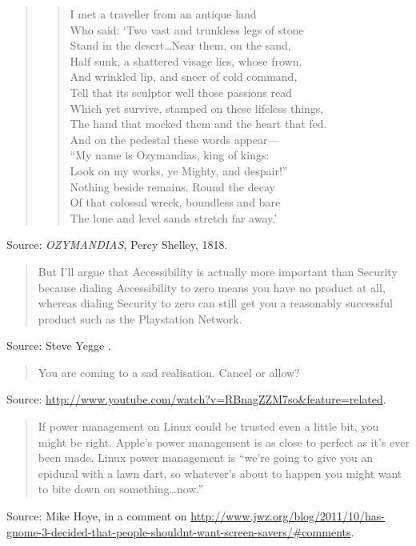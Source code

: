 \documentclass[a4paper]{article}
\begin{document}
\begin{quote}
\begin{verse}
I met a traveller from an antique land \\
Who said: `Two vast and trunkless legs of stone \\
Stand in the desert\ldots Near them, on the sand, \\
Half sunk, a shattered visage lies, whose frown, \\
And wrinkled lip, and sneer of cold command, \\
Tell that its sculptor well those passions read \\
Which yet survive, stamped on these lifeless things, \\
The hand that mocked them and the heart that fed. \\
And on the pedestal these words appear--- \\
``My name is Ozymandias, king of kings: \\
Look on my works, ye Mighty, and despair!'' \\
Nothing beside remains. Round the decay \\
Of that colossal wreck, boundless and bare \\
The lone and level sands stretch far away.' \\
\end{verse}
\end{quote}
Source: \emph{OZYMANDIAS}, Percy Shelley, 1818.
\medskip

\begin{quote}
	But I'll argue that Accessibility is actually more important than Security because dialing
Accessibility to zero means you have no product at all, whereas dialing Security to zero can still
get you a reasonably successful product such as the Playstation Network.
\end{quote}
Source: Steve Yegge \citep{Yegge2011}.
\medskip

\begin{quote}
	You are coming to a sad realisation.  Cancel or allow?
\end{quote}
Source: \url{http://www.youtube.com/watch?v=RBnagZZM7so&feature=related}.
\medskip

\begin{quote}
	If power management on Linux could be trusted even a little bit, you might be right.  Apple's
power management is as close to perfect as it's ever been made.  Linux power management is ``we're
going to give you an epidural with a lawn dart, so whatever's about to happen you might want to
bite down on something\ldots now.''
\end{quote}
Source: Mike Hoye, in a comment on \url{http://www.jwz.org/blog/2011/10/has-gnome-3-decided-that-people-shouldnt-want-screen-savers/#comments}.
\medskip
\end{document}
